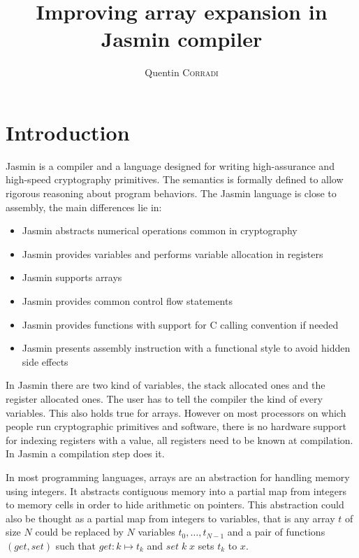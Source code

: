 \documentclass{article}
\title{Improving array expansion in Jasmin compiler}
\author{Quentin \textsc{Corradi}}
\begin{document}
\maketitle

\section{Introduction}

Jasmin is a compiler and a language designed for writing high-assurance and
high-speed cryptography primitives. The semantics is formally defined to allow
rigorous reasoning about program behaviors.
The Jasmin language is close to assembly, the main differences lie in:
\begin{itemize}
\item Jasmin abstracts numerical operations common in cryptography
\item Jasmin provides variables and performs variable allocation in registers
\item Jasmin supports arrays
\item Jasmin provides common control flow statements
\item Jasmin provides functions with support for C calling convention if needed
\item Jasmin presents assembly instruction with a functional style to avoid
hidden side effects
\end{itemize}

In Jasmin there are two kind of variables, the stack allocated ones and the
register allocated ones. The user has to tell the compiler the kind of every
variables. This also holds true for arrays. However on most processors on which
people run cryptographic primitives and software, there is no hardware support
for indexing registers with a value, all registers need to be known at
compilation. In Jasmin a compilation step does it.

\medskip

In most programming languages, arrays are an abstraction for handling memory
using integers. It abstracts contiguous memory into a partial map from integers
to memory cells in order to hide arithmetic on pointers. This abstraction could
also be thought as a partial map from integers to variables, that is any array
\(t\) of size \(N\) could be replaced by \(N\) variables
\(t_0, \dots, t_{N - 1}\) and a pair of functions
\((\mathit{get}, \mathit{set})\) such that \(\mathit{get} : k \mapsto t_k\) and
\(\mathit{set}\;k\;x\) sets \(t_k\) to \(x\).
\end{document}
